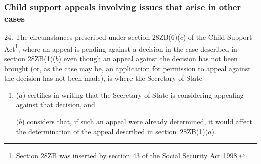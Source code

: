 \documentclass[12pt,a4paper]{article}
\begin{document}

\subsubsection[24. Child support appeals involving issues that arise in other cases]{Child support appeals involving issues that arise in other cases}

24.  The circumstances prescribed under section 28ZB(6)($c$) of the Child Support Act\footnote{\frenchspacing Section 28ZB was inserted by section 43 of the Social Security Act 1998.}, where an appeal is pending against a decision in the case described in section 28ZB(1)($b$) even though an appeal against the decision has not been brought (or, as the case may be, an application for 
permission  %
to appeal against the decision has not been made), is where the 
Secretary of State%
—
\begin{enumerate}\item[]
($a$) certifies in writing that 
the Secretary of State  %
is considering appealing against that decision, and

\begin{sloppypar}
($b$) considers that, if such an appeal were already determined, it would affect the determination of the appeal described in section~28ZB(1)($a$).
\end{sloppypar}
\end{enumerate}
\end{document}
